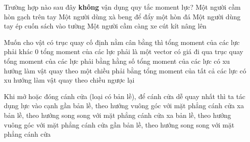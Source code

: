 \begin{ex}%
Trường hợp nào sau đây \textbf{không} vận dụng quy tắc moment lực?
\choice
{Một người cầm hòn gạch trên tay}
{Một người dùng xà beng để đẩy một hòn đá} 
{\True Một người dùng tay ép cuốn sách vào tường} 
{Một người cầm càng xe cút kít nâng lên}
\end{ex}
\begin{ex}%
Muốn cho vật có trục quay cố định nằm cân bằng thì 
\choice
{tổng moment của các lực phải khác 0}
{tổng moment của các lực phải là một vector có giá đi qua trục quay} 
{tổng moment của các lực phải bằng hằng số}
{\True tổng moment của các lực có xu hướng làm vật quay theo một chiều phải bằng  tổng moment của tất cả các lực có xu hướng làm vật quay theo chiều ngược lại}
\end{ex}
\begin{ex}%
Khi mở hoặc đóng cánh cửa (loại có bản lề), để cánh cửa dễ quay nhất thì ta tác dụng lực vào cạnh
\choice
{gần bản lề, theo hướng vuông góc với mặt phẳng cánh cửa}
{xa bản lề, theo hướng song song với mặt phẳng cánh cửa}
{\True xa bản lề, theo hướng vuông góc với mặt phẳng cánh cửa}
{gần bản lề, theo hướng song song với mặt phẳng cánh cửa}
\loigiai{

}
\end{ex}
\begin{ex}%
	
\end{ex}
